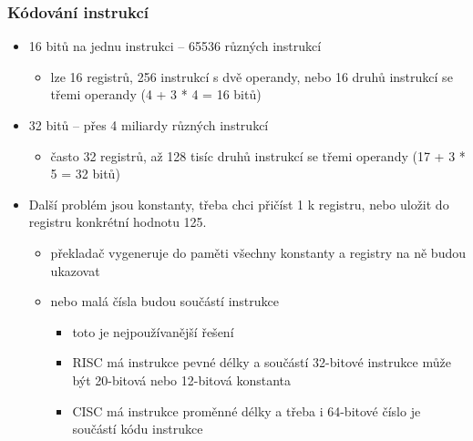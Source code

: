 \documentclass{beamer}
\begin{document}
\begin{frame}
\frametitle{Kódování instrukcí}

\begin{itemize}
\item 16 bitů na jednu instrukci -- 65536 různých instrukcí
\begin{itemize}
\item lze 16 registrů, 256 instrukcí s dvě operandy, nebo 16 druhů instrukcí se třemi operandy (4 + 3 * 4 = 16 bitů)
\end{itemize}
\item 32 bitů -- přes 4 miliardy různých instrukcí 
\begin{itemize}
\item často 32 registrů, až 128 tisíc druhů instrukcí se třemi operandy (17 + 3 * 5 = 32 bitů)
\end{itemize}
\item Další problém jsou konstanty, třeba chci přičíst 1 k registru, nebo uložit do registru konkrétní hodnotu 125. 
\begin{itemize}
\item překladač vygeneruje do paměti všechny konstanty a registry na ně budou ukazovat
\item nebo malá čísla budou součástí instrukce
\begin{itemize}
\item toto je nejpoužívanější řešení
\item RISC má instrukce pevné délky a součástí 32-bitové instrukce může být 20-bitová nebo 12-bitová konstanta
\item CISC má instrukce proměnné délky a třeba i 64-bitové číslo je součástí kódu instrukce
\end{itemize}
\end{itemize}
\end{itemize}
\end{frame}
\end{document}
